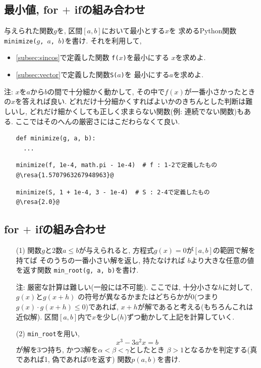 \documentclass[10pt,dvipdfmx]{article}
\newcommand{\resa}[1]{ {\textsl{$\rightarrow$ #1}}}
\begin{document}
\subsection{{\scriptsize 最小値, for $+$ ifの組み合わせ}}
与えられた関数$g$を, 区間$[a, b]$において最小とする$x$を
求めるPython関数 {\tt minimize($g$, $a$, $b$)}を書け.
それを利用して,

\begin{itemize}
\item \ref{subsec:sincos}で定義した関数
{\tt f($x$)}を最小にする
$x$を求めよ.

\item \ref{subsec:vector}で定義した関数{\tt S($a$)}を
最小にする$a$を求めよ.
\end{itemize}

注: $x$を$a$から$b$の間で十分細かく動かして,
その中で$f(x)$が一番小さかったときの$x$を答えれば良い.
どれだけ十分細かくすればよいかのきちんとした判断は難しいし,
どれだけ細かくしても正しく求まらない関数(例: 連続でない関数)もある.
ここではそのへんの厳密さにはこだわらなくて良い.
\begin{itemize}
\item []
\begin{lstlisting}
def minimize(g, a, b):
  ...
\end{lstlisting}
\item []
\begin{lstlisting}
minimize(f, 1e-4, math.pi - 1e-4)  # f : 1-2で定義したもの
@\resa{1.5707963267948963}@
\end{lstlisting}
\item []
\begin{lstlisting}
minimize(S, 1 + 1e-4, 3 - 1e-4)  # S : 2-4で定義したもの
@\resa{2.0}@
\end{lstlisting}
\end{itemize}

\subsection{{\scriptsize for $+$ ifの組み合わせ}}
\begin{itemize}
\item [(1)]
  関数$g$と2数$a \leq b$が与えられると,
  方程式$g(x) = 0$が$[a, b]$の範囲で解を持てば
  そのうちの一番小さい解を返し, 持たなければ
  $b$より大きな任意の値を返す関数
  {\tt min\_root(g, a, b)}を書け.

注: 厳密な計算は難しい(一般には不可能). ここでは,
十分小さな$h$に対して, $g(x)$と$g(x+h)$
の符号が異なるかまたはどちらかが0(つまり
$g(x) \cdot g(x+h) \leq 0$)であれば,
$x+h$が解であると考える(もちろんこれは近似解).
区間$[a,b]$内で$x$を少し($h$)ずつ動かして上記を計算していく.

\item [(2)] {\tt min\_root}を用い, 
  \[ x^3 - 3a^2 x = b \]
が解を3つ持ち, かつ3解を$\alpha < \beta < \gamma$としたとき
$\beta > 1$となるかを判定する(真であれば1, 偽であれば0を返す)
関数$p(a, b)$を書け.
\end{itemize}
\end{document}
